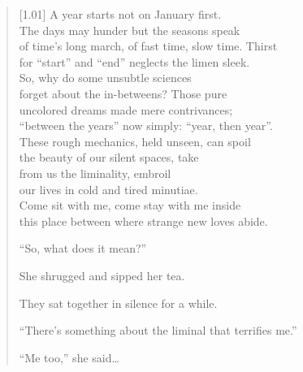 \begin{verse}[1.01\textwidth]
A year starts not on January first.\\
\vin The days may hunder but the seasons speak\\
of time's long march, of fast time, slow time. Thirst\\
\vin for ``start'' and ``end'' neglects the limen sleek.\\
So, why do some unsubtle sciences\\
\vin forget about the in-betweens? Those pure\\
uncolored dreams made mere contrivances;\\
\vin ``between the years'' now simply: ``year, then year''.\\
These rough mechanics, held unseen, can spoil\\
\vin the beauty of our silent spaces, take\\
from us the liminality, embroil\\
\vin our lives in cold and tired minutiae.\\
\vin \vin Come sit with me, come stay with me inside\\
\vin \vin this place between where strange new loves abide.

\secdiv

``So, what does it mean?''

She shrugged and sipped her tea.

They sat together in silence for a while.

``There's something about the liminal that terrifies me.''

\hfill ``Me too,'' she said\ldots{}
\end{verse}
